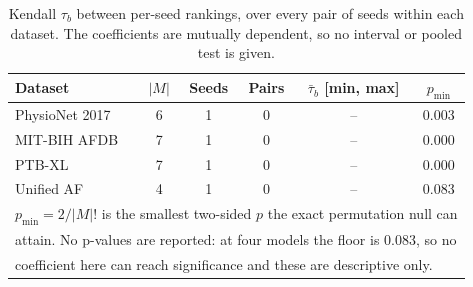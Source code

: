 \begin{table}[ht]
\centering
\caption{Kendall $\tau_b$ between per-seed rankings, over every pair of seeds within each dataset. The coefficients are mutually dependent, so no interval or pooled test is given.}
\label{tab:kendall_tau}
\small
\begin{tabular}{lccccc}
\toprule
Dataset & $|M|$ & Seeds & Pairs & $\bar\tau_b$ [min, max] & $p_{\min}$ \\
\midrule
PhysioNet 2017 & 6 & 1 & 0 & -- & 0.003 \\
MIT-BIH AFDB & 7 & 1 & 0 & -- & 0.000 \\
PTB-XL & 7 & 1 & 0 & -- & 0.000 \\
Unified AF & 4 & 1 & 0 & -- & 0.083 \\
\midrule
\multicolumn{6}{l}{\footnotesize $p_{\min}=2/|M|!$ is the smallest two-sided $p$ the exact permutation null can} \\
\multicolumn{6}{l}{\footnotesize attain. No p-values are reported: at four models the floor is 0.083, so no} \\
\multicolumn{6}{l}{\footnotesize coefficient here can reach significance and these are descriptive only.} \\
\bottomrule
\end{tabular}
\end{table}
